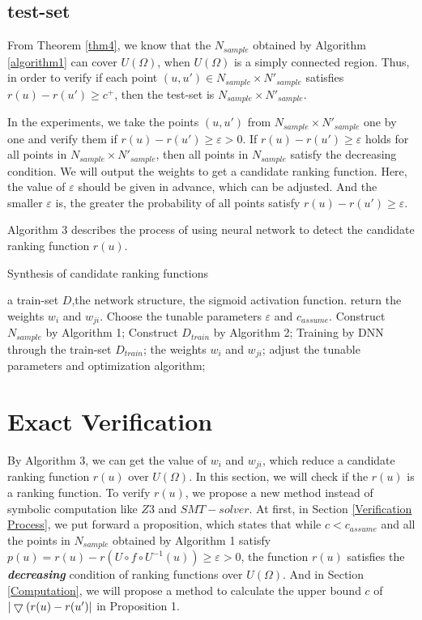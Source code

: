 \subsection{test-set}
\label{test-set}
From Theorem \ref{thm4}, we know that the $N_{sample}$ obtained by Algorithm \ref{algorithm1} can cover $U(\Omega)$, when $U(\Omega)$ is a simply connected region. Thus, in order to verify if each point $(u,u') \in {N_{sample}} \times {{N'}_{sample}}$ satisfies $r(u)-r(u')\ge c^+$, then the test-set is  ${N_{sample}} \times {{N'}_{sample}}$.

In the experiments, we take the points $(u,u')$ from ${N_{sample}} \times {{N'}_{sample}}$ one by one and verify them if $r(u) - r(u') \ge \varepsilon > 0$. If $r(u) - r(u') \ge \varepsilon $ holds for all points in ${N_{sample}} \times {{N'}_{sample}}$, then all points in $N_{sample}$ satisfy the decreasing condition. We will output the weights to get a candidate ranking function. Here, the value of $\varepsilon $ should be given in advance, which can be adjusted. And the smaller $\varepsilon $ is, the greater the probability of all points satisfy $r(u) - r(u') \ge \varepsilon $.

Algorithm 3 describes the process of using neural network to detect the candidate ranking function $r(u)$.
\begin{algorithm}[H]
	\label{algorithm3}
	\caption{Synthesis of candidate ranking functions}
	\begin{algorithmic}[1] %
		\Require a train-set ${D}$,the network structure, the sigmoid activation function.          
		\Ensure return the weights $w_i$ and $w_{ji}$.
		\State Choose the tunable parameters $\varepsilon $ and $c_{assume}$.
		\State Construct $N_{sample}$ by Algorithm 1;
		\State Construct $D_{train}$ by Algorithm 2;
		\State Training by DNN through the train-set $D_{train}$;
		\State \Return the weights $w_i$ and $w_{ji}$;
		\Else
		\State adjust the tunable parameters and  optimization algorithm;
		\EndIf 
	\end{algorithmic}
\end{algorithm}

\section{Exact Verification}
\label{Exact Verification}
By Algorithm 3, we can get the value of $w_i$ and $w_{ji}$, which reduce a candidate ranking function $r(u)$ over $U(\Omega)$. In this section, we will check if the $r(u)$ is a ranking function. To verify $r(u)$, we propose a new method instead of symbolic computation like $Z3$ and $SMT-solver$. At first, in Section \ref{Verification Process}, we put forward a proposition, which states that while $c < c_{assume}$ and all the points in ${N_{sample}}$ obtained by Algorithm 1 satisfy $p(u)=r(u) - r(U \circ f \circ {U^{ - 1}}(u)) \ge \varepsilon  > 0$, the function $r(u)$ satisfies the \textbf{\emph{decreasing}} condition of ranking functions over $U(\Omega )$. And in Section \ref{Computation}, we will propose a method to calculate the upper bound $c$ of ${\rm{|}}\bigtriangledown(r(u) - r(u')|$ in Proposition 1.
